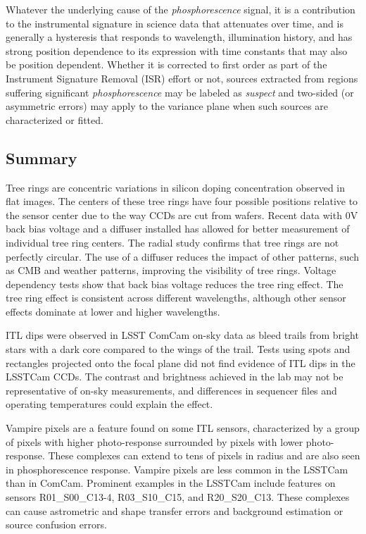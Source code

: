 Whatever the underlying cause of the {\it phosphorescence} signal, it is a contribution to the instrumental signature in science data that attenuates over time, and is generally a hysteresis that responds to wavelength, illumination history, and has strong position dependence to its expression with time constants that may also be position dependent. Whether it is corrected to first order as part of the Instrument Signature Removal (ISR) effort or not, sources extracted from regions suffering significant {\it phosphorescence} may be labeled as {\it suspect} and two-sided (or asymmetric errors) may apply to the variance plane when such sources are characterized or fitted.

\clearpage

\subsection{Summary}
Tree rings are concentric variations in silicon doping concentration observed in flat images. The centers of these tree rings have four possible positions relative to the sensor center due to the way CCDs are cut from wafers. Recent data with 0V back bias voltage and a diffuser installed has allowed for better measurement of individual tree ring centers. The radial study confirms that tree rings are not perfectly circular. The use of a diffuser reduces the impact of other patterns, such as CMB and weather patterns, improving the visibility of tree rings. Voltage dependency tests show that back bias voltage reduces the tree ring effect. The tree ring effect is consistent across different wavelengths, although other sensor effects dominate at lower and higher wavelengths.

ITL dips were observed in LSST ComCam on-sky data as bleed trails from bright stars with a dark core compared to the wings of the trail. Tests using spots and rectangles projected onto the focal plane did not find evidence of ITL dips in the LSSTCam CCDs. The contrast and brightness achieved in the lab may not be representative of on-sky measurements, and differences in sequencer files and operating temperatures could explain the effect.

Vampire pixels are a feature found on some ITL sensors, characterized by a group of pixels with higher photo-response surrounded by pixels with lower photo-response. These complexes can extend to tens of pixels in radius and are also seen in phosphorescence response. Vampire pixels are less common in the LSSTCam than in ComCam. Prominent examples in the LSSTCam include features on sensors R01\_S00\_C13-4, R03\_S10\_C15, and R20\_S20\_C13. These complexes can cause astrometric and shape transfer errors and background estimation or source confusion errors.

